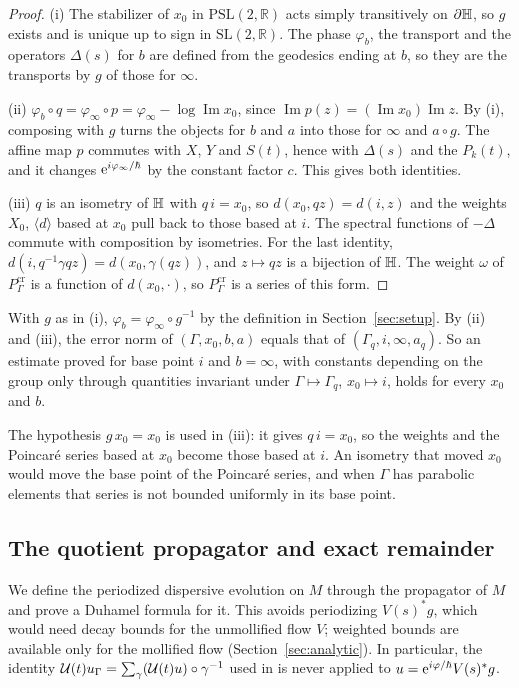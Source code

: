 \begin{proof}
(i) The stabilizer of $x_0$ in $\mathrm{PSL}(2,\mathbb R)$ acts simply transitively on $\partial\mathbb{H}$, so $g$ exists and is unique up
to sign in $\mathrm{SL}(2,\mathbb R)$. The phase $\varphi_b$, the transport and
the operators $\Delta(s)$ for $b$ are defined from the geodesics ending at $b$, so they are the transports by $g$ of those for $\infty$.

(ii) $\varphi_b\circ q=\varphi_\infty\circ p=\varphi_\infty-\log\operatorname{Im}x_0$, since $\operatorname{Im}p(z)=(\operatorname{Im}x_0)\operatorname{Im}z$.
By (i), composing with $g$ turns the objects for $b$ and $a$ into those for $\infty$ and $a\circ g$. The affine map $p$ commutes with
$X$, $Y$ and $S(t)$, hence with $\Delta(s)$ and the $P_k(t)$, and it changes $\mathrm{e}^{i\varphi_\infty/\hbar}$ by the constant factor $c$. This
gives both identities.

(iii) $q$ is an isometry of $\mathbb{H}$ with $q\,i=x_0$, so $d(x_0,qz)=d(i,z)$ and the weights $X_0$, $\langle d\rangle$ based at $x_0$ pull
back to those based at $i$. The spectral functions of $-\Delta$ commute with composition by isometries. For the last identity,
$d(i,q^{-1}\gamma qz)=d(x_0,\gamma(qz))$, and $z\mapsto qz$ is a bijection of $\mathbb{H}$. The weight $\omega$ of $P^{\mathrm{cr}}_\Gamma$ is a
function of $d(x_0,\cdot)$, so $P^{\mathrm{cr}}_\Gamma$ is a series of this form.
\end{proof}

With $g$ as in (i), $\varphi_b=\varphi_\infty\circ g^{-1}$ by the definition in Section~\ref{sec:setup}. By (ii) and (iii), the
error norm of
$(\Gamma,x_0,b,a)$ equals that of $(\Gamma_q,i,\infty,a_q)$. So an estimate proved for base point $i$ and $b=\infty$, with
constants depending on the group only through quantities invariant under $\Gamma\mapsto\Gamma_q$, $x_0\mapsto i$, holds for every
$x_0$ and $b$.

\begin{remark}
The hypothesis $g\,x_0=x_0$ is used in (iii): it gives $q\,i=x_0$, so the weights and the Poincar\'e series based at $x_0$
become those based at $i$. An isometry that moved $x_0$ would move the base point of the Poincar\'e series, and when $\Gamma$
has parabolic elements that series is not bounded uniformly in its base point.
\end{remark}

\subsection{The quotient propagator and exact remainder}\label{subsec:dd-surf}\label{subsec:dd-id}
We define the periodized dispersive evolution on $M$ through the propagator of $M$ and prove a Duhamel formula for it. This
avoids periodizing $V(s)^*g$, which would need decay bounds for the unmollified flow $V$; weighted bounds are available only
for the mollified flow (Section~\ref{sec:analytic}). In particular, the identity
$\mathcal{U}(t)u_\Gamma=\sum_\gamma(\mathcal{U}(t)u)\circ\gamma^{-1}$ used in \cite{S} is never applied to $u=\mathrm{e}^{i\varphi/\hbar}V(s)^*g$.


